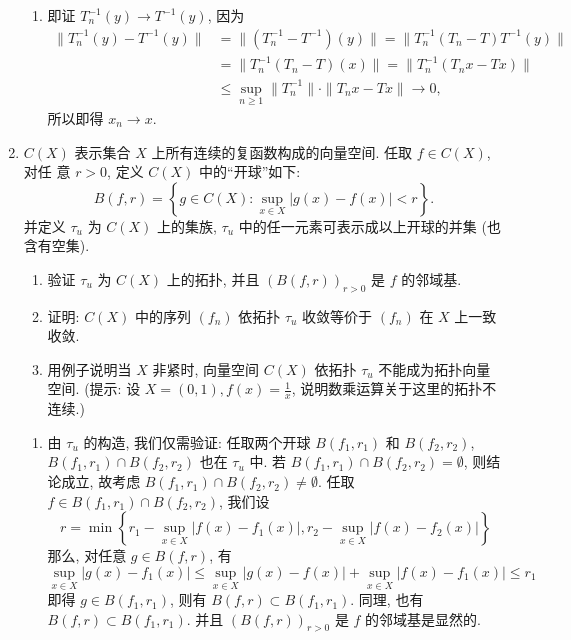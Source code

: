 \begin{enumerate}
\begin{answer}
\begin{enumerate}
        \item 即证 $T_n^{-1}(y)\to T^{-1}(y)$, 因为
        \begin{align*}
            \|T_n^{-1}(y)-T^{-1}(y)\|
            &=\|(T_n^{-1}-T^{-1})(y)\|=\|T_n^{-1}(T_n-T)T^{-1}(y)\| \\
            &=\|T_n^{-1}(T_n-T)(x)\|=\|T_n^{-1}(T_nx-Tx)\| \\
            &\leq\sup_{n\geq 1}\|T_n^{-1}\|\cdot\|T_nx-Tx\|\to 0,
        \end{align*}
        所以即得 $x_n\to x$.
      \end{enumerate}
    \end{answer}
  \item $C(X)$ 表示集合 $X$ 上所有连续的复函数构成的向量空间. 任取 $f \in C(X)$, 对任 意 $r>0$, 定义 $C(X)$ 中的“开球”如下:
  \[
    B(f, r)=\left\{g \in C(X): \sup _{x \in X}|g(x)-f(x)|<r\right\} .
  \]
  并定义 $\tau_{u}$ 为 $C(X)$ 上的集族, $\tau_{u}$ 中的任一元素可表示成以上开球的并集 (也含有空集).
    \begin{enumerate}
      \item 验证 $\tau_{u}$ 为 $C(X)$ 上的拓扑, 并且 $(B(f, r))_{r>0}$ 是 $f$ 的邻域基.
      \item 证明: $C(X)$ 中的序列 $\left(f_{n}\right)$ 依拓扑 $\tau_{u}$ 收敛等价于 $\left(f_{n}\right)$ 在 $X$ 上一致收敛.
      \item 用例子说明当 $X$ 非紧时, 向量空间 $C(X)$ 依拓扑 $\tau_{u}$ 不能成为拓扑向量空间. (提示: 设 $X=(0,1), f(x)=\frac{1}{x}$, 说明数乘运算关于这里的拓扑不连续.)
    \end{enumerate}
    \begin{answer}
      \begin{enumerate}
        \item 由 $\tau_{u}$ 的构造, 我们仅需验证: 任取两个开球 $B\left(f_{1}, r_{1}\right)$ 和 $B\left(f_{2}, r_{2}\right)$,
        $B(f_{1}, r_1)\cap B(f_{2},r_{2})$ 也在 $\tau_{u}$ 中. 
        若 $B\left(f_{1}, r_{1}\right) \cap B\left(f_{2}, r_{2}\right)=\emptyset$, 则结论成立, 
        故考虑 $B\left(f_{1}, r_{1}\right) \cap B\left(f_{2}, r_{2}\right) \neq\emptyset$. 
        任取 $f \in B\left(f_{1}, r_{1}\right) \cap B\left(f_{2}, r_{2}\right)$, 我们设
        \[
        r=\min \left\{r_{1}-\sup _{x \in X}\left|f(x)-f_{1}(x)\right|, r_{2}-\sup _{x \in X}\left|f(x)-f_{2}(x)\right|\right\}
        \]
        那么, 对任意 $g\in B(f, r)$, 有
        \[
        \sup _{x \in X}\left|g(x)-f_{1}(x)\right| \leq \sup _{x \in X}|g(x)-f(x)|+\sup _{x \in X}\left|f(x)-f_{1}(x)\right| \leq r_{1}
        \]
        即得 $g \in B\left(f_{1}, r_{1}\right)$, 则有 $B(f, r) \subset B\left(f_{1}, r_{1}\right)$. 
        同理, 也有 $B(f, r) \subset B\left(f_{1}, r_{1}\right)$. 并且 $(B(f, r))_{r>0}$ 是 $f$ 的邻域基是显然的.
    

\end{enumerate}
\end{answer}
\end{enumerate}
